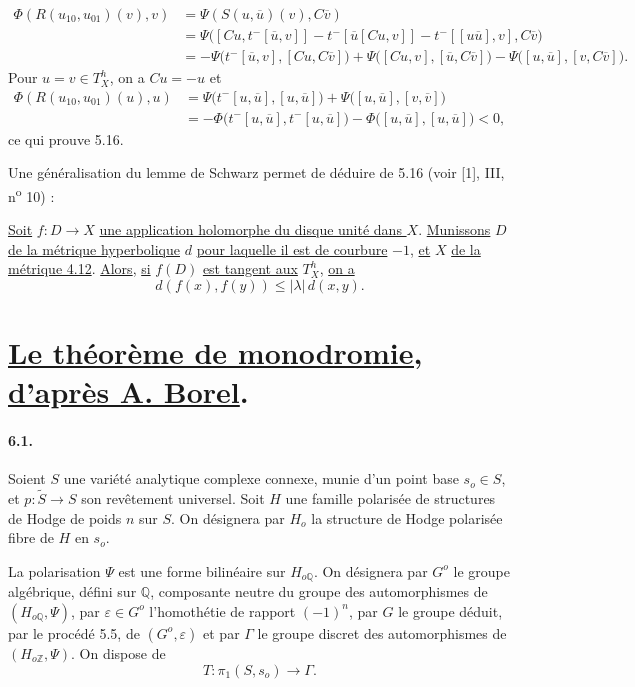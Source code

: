 \documentclass[10pt,leqno]{article}
\newcommand{\Z}{\mathbb Z}
\newcommand{\Q}{\mathbb Q}
\theoremstyle{deligne}
\renewcommand{\underline}[1]{\uline{#1}}
\begin{document}
\[
\begin{aligned}
\Phi(R(u_{10},u_{01})(v),v)
&=\Psi(S(u,\overline u)(v),C\overline v)\\
&=\Psi\bigl([Cu,t^-[\overline u,v]]-t^-[\overline u[Cu,v]]-t^-[[u\overline u],v],C\overline v\bigr)\\
&=-\Psi\bigl(t^-[\overline u,v],[Cu,C\overline v]\bigr)
  +\Psi\bigl([Cu,v],[\overline u,C\overline v]\bigr)
  -\Psi\bigl([u,\overline u],[v,C\overline v]\bigr).
\end{aligned}
\]
Pour $u=v\in T_X^h$, on a $Cu=-u$ et
\[
\begin{aligned}
\Phi(R(u_{10},u_{01})(u),u)
&=\Psi\bigl(t^-[u,\overline u],[u,\overline u]\bigr)
  +\Psi\bigl([u,\overline u],[v,\overline v]\bigr)\\
&=-\Phi\bigl(t^-[u,\overline u],t^-[u,\overline u]\bigr)
  -\Phi\bigl([u,\overline u],[u,\overline u]\bigr)<0,
\end{aligned}
\]
ce qui prouve 5.16.

Une généralisation du lemme de Schwarz permet de déduire de 5.16 (voir [1], III, n\textsuperscript{o} 10) :

\begin{corollaire}[5.17]
\underline{Soit} $f:D\to X$ \underline{une application holomorphe du disque unité dans $X$}. \underline{Munissons} $D$ \underline{de la métrique hyperbolique} $d$ \underline{pour laquelle il est de courbure} $-1$, \underline{et} $X$ \underline{de la métrique 4.12}. \underline{Alors}, \underline{si} $f(D)$ \underline{est tangent aux} $T_X^h$, \underline{on a}
\[
  d(f(x),f(y))\le |\lambda|\,d(x,y).
\]
\end{corollaire}

\section{\underline{Le théorème de monodromie, d'après A. Borel}.}

\paragraph{6.1.}
Soient $S$ une variété analytique complexe connexe, munie d'un point base $s_o\in S$, et $p:\widetilde S\to S$ son revêtement universel. Soit $H$ une famille polarisée de structures de Hodge de poids $n$ sur $S$. On désignera par $H_o$ la structure de Hodge polarisée fibre de $H$ en $s_o$.

La polarisation $\Psi$ est une forme bilinéaire sur $H_{o\Q}$. On désignera par $G^o$ le groupe algébrique, défini sur $\Q$, composante neutre du groupe des automorphismes de $(H_{o\Q},\Psi)$, par $\varepsilon\in G^o$ l'homothétie de rapport $(-1)^n$, par $G$ le groupe déduit, par le procédé 5.5, de $(G^o,\varepsilon)$ et par $\Gamma$ le groupe discret des automorphismes de $(H_{o\Z},\Psi)$. On dispose de
\[
\tag{6.1.1}
  T:\pi_1(S,s_o)\longrightarrow\Gamma .
\]
\end{document}
